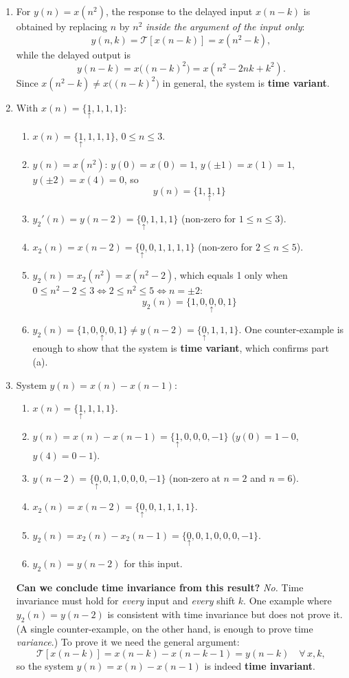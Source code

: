 \documentclass[12pt,a4paper]{article}
\newcommand{\org}[1]{\underset{\uparrow}{#1}}
\begin{document}
\begin{enumerate}[label=\textbf{(\alph*)}, leftmargin=*]
    \item For $y(n) = x(n^2)$, the response to the delayed input $x(n-k)$ is obtained by replacing $n$ by $n^2$ \emph{inside the argument of the input only}:
    \[ y(n,k) = \mathcal{T}[x(n-k)] = x(n^2 - k), \]
    while the delayed output is
    \[ y(n-k) = x\big((n-k)^2\big) = x(n^2 - 2nk + k^2). \]
    Since $x(n^2-k) \ne x\big((n-k)^2\big)$ in general, the system is \textbf{time variant}.

    \item With $x(n) = \{\org{1}, 1, 1, 1\}$:
    \begin{enumerate}[label=(\arabic*)]
        \item $x(n) = \{\org{1}, 1, 1, 1\}$, $0 \le n \le 3$.
        \item $y(n) = x(n^2)$: $y(0) = x(0) = 1$, $y(\pm1) = x(1) = 1$, $y(\pm2) = x(4) = 0$, so
        \[ y(n) = \{1, \org{1}, 1\} \]
        \item $y_2'(n) = y(n-2) = \{\org{0}, 1, 1, 1\}$ (non-zero for $1 \le n \le 3$).
        \item $x_2(n) = x(n-2) = \{\org{0}, 0, 1, 1, 1, 1\}$ (non-zero for $2 \le n \le 5$).
        \item $y_2(n) = x_2(n^2) = x(n^2 - 2)$, which equals 1 only when $0 \le n^2 - 2 \le 3 \Leftrightarrow 2 \le n^2 \le 5 \Leftrightarrow n = \pm 2$:
        \[ y_2(n) = \{1, 0, \org{0}, 0, 1\} \]
        \item $y_2(n) = \{1, 0, \org{0}, 0, 1\} \neq y(n-2) = \{\org{0}, 1, 1, 1\}$. One counter-example is enough to show that the system is \textbf{time variant}, which confirms part (a).
    \end{enumerate}

    \item System $y(n) = x(n) - x(n-1)$:
    \begin{enumerate}[label=(\arabic*)]
        \item $x(n) = \{\org{1}, 1, 1, 1\}$.
        \item $y(n) = x(n) - x(n-1) = \{\org{1}, 0, 0, 0, -1\}$ ($y(0) = 1 - 0$, $y(4) = 0 - 1$).
        \item $y(n-2) = \{\org{0}, 0, 1, 0, 0, 0, -1\}$ (non-zero at $n = 2$ and $n = 6$).
        \item $x_2(n) = x(n-2) = \{\org{0}, 0, 1, 1, 1, 1\}$.
        \item $y_2(n) = x_2(n) - x_2(n-1) = \{\org{0}, 0, 1, 0, 0, 0, -1\}$.
        \item $y_2(n) = y(n-2)$ for this input.
    \end{enumerate}
    \textbf{Can we conclude time invariance from this result?} \emph{No.} Time invariance must hold for \emph{every} input and \emph{every} shift $k$. One example where $y_2(n) = y(n-2)$ is consistent with time invariance but does not prove it. (A single counter-example, on the other hand, is enough to prove time \emph{variance}.) To prove it we need the general argument:
    \[ \mathcal{T}[x(n-k)] = x(n-k) - x(n-k-1) = y(n-k) \quad \forall\, x, k, \]
    so the system $y(n) = x(n) - x(n-1)$ is indeed \textbf{time invariant}.


\end{enumerate}
\end{document}
